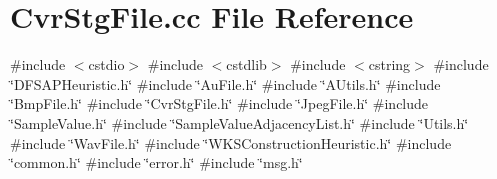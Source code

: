 \section{Cvr\+Stg\+File.\+cc File Reference}
\label{CvrStgFile_8cc}
{\ttfamily \#include $<$cstdio$>$}\newline
{\ttfamily \#include $<$cstdlib$>$}\newline
{\ttfamily \#include $<$cstring$>$}\newline
{\ttfamily \#include \char`\"{}D\+F\+S\+A\+P\+Heuristic.\+h\char`\"{}}\newline
{\ttfamily \#include \char`\"{}Au\+File.\+h\char`\"{}}\newline
{\ttfamily \#include \char`\"{}A\+Utils.\+h\char`\"{}}\newline
{\ttfamily \#include \char`\"{}Bmp\+File.\+h\char`\"{}}\newline
{\ttfamily \#include \char`\"{}Cvr\+Stg\+File.\+h\char`\"{}}\newline
{\ttfamily \#include \char`\"{}Jpeg\+File.\+h\char`\"{}}\newline
{\ttfamily \#include \char`\"{}Sample\+Value.\+h\char`\"{}}\newline
{\ttfamily \#include \char`\"{}Sample\+Value\+Adjacency\+List.\+h\char`\"{}}\newline
{\ttfamily \#include \char`\"{}Utils.\+h\char`\"{}}\newline
{\ttfamily \#include \char`\"{}Wav\+File.\+h\char`\"{}}\newline
{\ttfamily \#include \char`\"{}W\+K\+S\+Construction\+Heuristic.\+h\char`\"{}}\newline
{\ttfamily \#include \char`\"{}common.\+h\char`\"{}}\newline
{\ttfamily \#include \char`\"{}error.\+h\char`\"{}}\newline
{\ttfamily \#include \char`\"{}msg.\+h\char`\"{}}\newline
